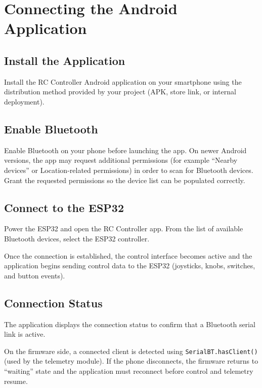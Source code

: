 \chapter{Connecting the Android Application}


\section{Install the Application}
Install the RC Controller Android application on your smartphone using the distribution method provided
by your project (APK, store link, or internal deployment).

\section{Enable Bluetooth}
Enable Bluetooth on your phone before launching the app. On newer Android versions, the app may request
additional permissions (for example ``Nearby devices'' or Location-related permissions) in order to scan
for Bluetooth devices. Grant the requested permissions so the device list can be populated correctly.

\section{Connect to the ESP32}
Power the ESP32 and open the RC Controller app. From the list of available Bluetooth devices, select the
ESP32 controller.

Once the connection is established, the control interface becomes active and the application begins sending
control data to the ESP32 (joysticks, knobs, switches, and button events).

\section{Connection Status}
The application displays the connection status to confirm that a Bluetooth serial link is active.

On the firmware side, a connected client is detected using \verb|SerialBT.hasClient()| (used by the telemetry
module). If the phone disconnects, the firmware returns to ``waiting'' state and the application must reconnect
before control and telemetry resume.

